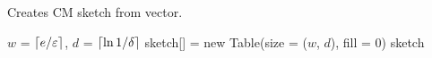 \begin{algorithm}[H]
    \label{alg:create_sketch}    
    \caption{Creates CM sketch from vector.}
    \DontPrintSemicolon
    
    \;        
    $w$ = $\lceil {e / \varepsilon} \rceil$,
    $d$ = $\lceil {\ln 1 / \delta} \rceil$\;
    sketch[] = new Table(size = ($w$, $d$), fill = $0$)\;
    \Return sketch
        
\end{algorithm}
